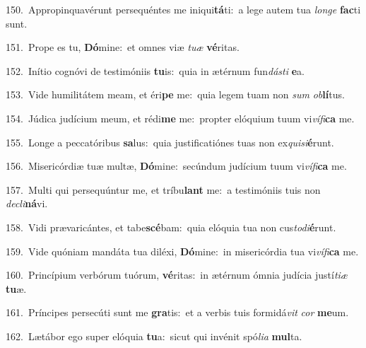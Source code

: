 {\numbfont\textcolor{\numbcolor}{150.}}~Appropinquavérunt persequéntes me iniqui\-\textbf{tá}\-ti:~\star a lege autem tua \textit{lon}\-\textit{ge} \textbf{fac}\-ti sunt.\par
{\numbfont\textcolor{\numbcolor}{151.}}~Prope es tu, \textbf{Dó}\-mine:~\star et omnes viæ \textit{tu}\-\textit{æ} \textbf{vé}\-ritas.\par
{\numbfont\textcolor{\numbcolor}{152.}}~Inítio cognóvi de testimóniis \textbf{tu}\-is:~\star quia in ætérnum fun\-\textit{dás}\-\textit{ti} \textbf{e}\-a.\par
{\numbfont\textcolor{\numbcolor}{153.}}~Vide humilitátem meam, et éri\textbf{pe} me:~\star quia legem tuam non \textit{sum} \textit{ob}\-\textbf{lí}tus.\par
{\numbfont\textcolor{\numbcolor}{154.}}~Júdica judícium meum, et rédi\textbf{me} me:~\star propter elóquium tuum vi\-\textit{ví}\-\textit{fi}\textbf{ca} me.\par
{\numbfont\textcolor{\numbcolor}{155.}}~Longe a peccatóribus \textbf{sa}\-lus:~\star quia justificatiónes tuas non ex\-\textit{qui}\-\textit{si}\textbf{é}runt.\par
{\numbfont\textcolor{\numbcolor}{156.}}~Misericórdiæ tuæ multæ, \textbf{Dó}\-mine:~\star secúndum judícium tuum vi\-\textit{ví}\-\textit{fi}\textbf{ca} me.\par
{\numbfont\textcolor{\numbcolor}{157.}}~Multi qui persequúntur me, et tríbu\textbf{lant} me:~\star a testimóniis tuis non \textit{de}\-\textit{cli}\textbf{ná}vi.\par
{\numbfont\textcolor{\numbcolor}{158.}}~Vidi prævaricántes, et tabe\-\textbf{scé}\-bam:~\star quia elóquia tua non cus\-\textit{to}\-\textit{di}\textbf{é}runt.\par
{\numbfont\textcolor{\numbcolor}{159.}}~Vide quóniam mandáta tua diléxi, \textbf{Dó}\-mine:~\star in misericórdia tua vi\-\textit{ví}\-\textit{fi}\textbf{ca} me.\par
{\numbfont\textcolor{\numbcolor}{160.}}~Princípium verbórum tuórum, \textbf{vé}\-ritas:~\star in ætérnum ómnia judícia justí\-\textit{ti}\-\textit{æ} \textbf{tu}\-æ.\par
{\numbfont\textcolor{\numbcolor}{161.}}~Príncipes persecúti sunt me \textbf{gra}\-tis:~\star et a verbis tuis formidá\textit{vit} \textit{cor} \textbf{me}\-um.\par
{\numbfont\textcolor{\numbcolor}{162.}}~Lætábor ego super elóquia \textbf{tu}\-a:~\star sicut qui invénit spó\-\textit{li}\-\textit{a} \textbf{mul}\-ta.\par
